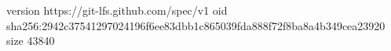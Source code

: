version https://git-lfs.github.com/spec/v1
oid sha256:2942c37541297024196f6ee83dbb1c865039fda888f72f8ba8a4b349cea23920
size 43840

